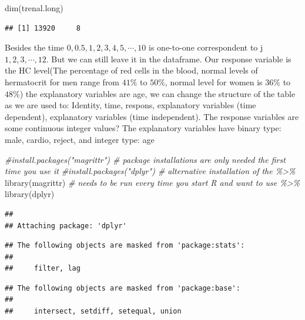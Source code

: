 \documentclass[
]{article}
\newenvironment{Shaded}{\begin{snugshade}}{\end{snugshade}}
\newcommand{\CommentTok}[1]{\textcolor[rgb]{0.56,0.35,0.01}{\textit{#1}}}
\newcommand{\FunctionTok}[1]{\textcolor[rgb]{0.00,0.00,0.00}{#1}}
\newcommand{\NormalTok}[1]{#1}
\begin{document}
\begin{Shaded}
\begin{Highlighting}[]
\FunctionTok{dim}\NormalTok{(trenal.long)}
\end{Highlighting}
\end{Shaded}

\begin{verbatim}
## [1] 13920     8
\end{verbatim}

Besides the time \(0,0.5,1,2,3,4,5,\cdots,10\) is one-to-one
correspondent to j \(1,2,3,\cdots,12\). But we can still leave it in the
dataframe. Our response variable is the HC level(The percentage of red
cells in the blood, normal levels of hermatocrit for men range from
\(41\%\) to \(50\%\), normal level for women is \(36\%\) to \(48\%\))
the explanatory variables are age, we can change the structure of the
table as we are used to: Identity, time, respons, explanatory variables
(time dependent), explanatory variables (time independent). The response
variables are some continuous integer values? The explanatory variables
have binary type: male, cardio, reject, and integer type: age

\begin{Shaded}
\begin{Highlighting}[]
\CommentTok{\#install.packages("magrittr") \# package installations are only needed the first time you use it}
\CommentTok{\#install.packages("dplyr")    \# alternative installation of the \%\textgreater{}\%}
\FunctionTok{library}\NormalTok{(magrittr) }\CommentTok{\# needs to be run every time you start R and want to use \%\textgreater{}\%}
\FunctionTok{library}\NormalTok{(dplyr)   }
\end{Highlighting}
\end{Shaded}

\begin{verbatim}
## 
## Attaching package: 'dplyr'
\end{verbatim}

\begin{verbatim}
## The following objects are masked from 'package:stats':
## 
##     filter, lag
\end{verbatim}

\begin{verbatim}
## The following objects are masked from 'package:base':
## 
##     intersect, setdiff, setequal, union
\end{verbatim}
\end{document}
